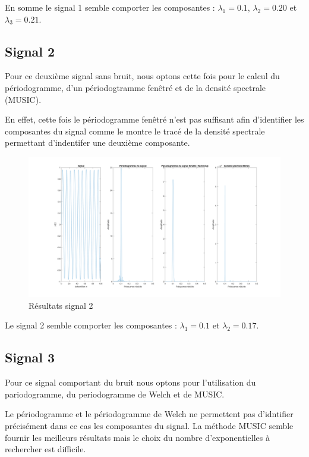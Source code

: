 \documentclass[12pt,a4paper,titlepage]{article}
\begin{document}
En somme le signal 1 semble comporter les composantes : $\lambda_1 = 0.1$, $\lambda_2 = 0.20$ et
$\lambda_3 = 0.21$.

\subsection*{Signal 2}

Pour ce deuxième signal sans bruit, nous optons cette fois pour le calcul du périodogramme, d'un
périodogtramme fenêtré et de la densité spectrale (MUSIC).

En effet, cette fois le périodogramme fenêtré n'est pas suffisant afin d'identifier les composantes
du signal comme le montre le tracé de la densité spectrale permettant d'indentifer une deuxième
composante.

\begin{figure}[H]
    \caption{Résultats signal 2}
    \includegraphics[width=\textwidth]{sig2}
    \centering
\end{figure}

Le signal 2 semble comporter les composantes : $\lambda_1 = 0.1$ et $\lambda_2 = 0.17$.

\subsection*{Signal 3}

Pour ce signal comportant du bruit nous optons pour l'utilisation du pariodogramme, du periodogramme de
Welch et de MUSIC.

Le périodogramme et le périodogramme de Welch ne permettent pas d'idntifier précisément dans ce
cas les composantes du signal. La méthode MUSIC semble fournir les meilleurs résultats mais le choix du
nombre d'exponentielles à rechercher est difficile.
\end{document}
